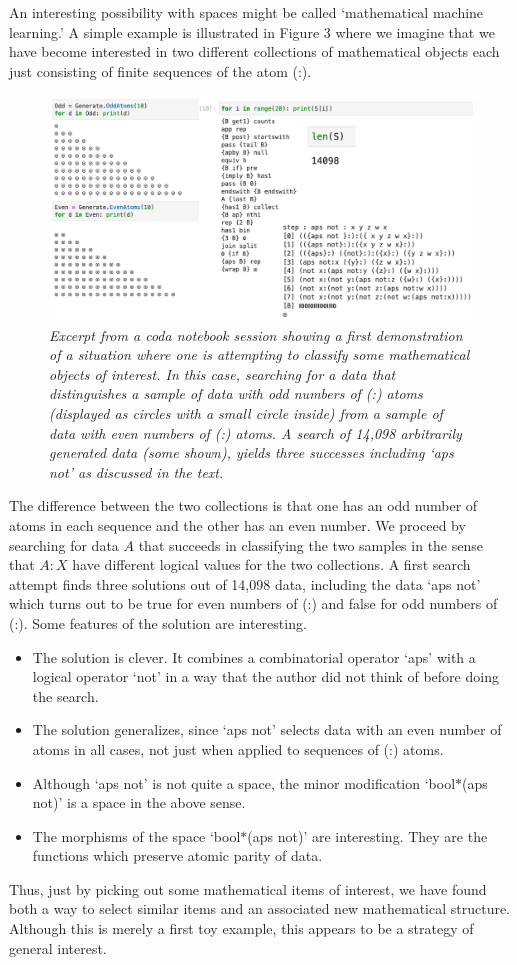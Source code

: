 \documentclass[11pt]{article}
\begin{document}
     An interesting possibility with spaces might be called `mathematical machine learning.'  A simple
example is illustrated in Figure 3 where we imagine that we have become interested in two different
collections of mathematical objects each just consisting of finite sequences of the atom (:).
\begin{figure}[h]
\centering
\includegraphics[width=1.0\textwidth]{machine_learning.png}
\caption{{\it Excerpt from a coda notebook session showing a first demonstration of a situation where one is 
attempting to classify some mathematical objects of interest.  In this case, searching for a data that distinguishes a sample of
data with odd numbers of (:) atoms (displayed as circles with a small circle inside) from a sample of data with even numbers of (:) atoms.  
A search of 14,098 arbitrarily generated data (some shown), yields three successes including `aps not' as discussed in the text.}}
\end{figure}
The difference between the two collections is that one has an odd number of atoms in each sequence and
the other has an even number.  We proceed by searching for data $A$ that succeeds in classifying
the two samples in the sense that $A:X$ have different logical values for the two collections.   A first search attempt
finds three solutions out of 14,098 data, including the data  `aps not' which turns out to be true for
even numbers of (:) and false for odd numbers of (:).
Some features of the solution are interesting.
\begin{itemize}
\item The solution is clever.  It combines a combinatorial operator `aps' with a logical operator `not'
in a way that the author did not think of before doing the search.
\item The solution generalizes, since `aps not' selects data with an even number of atoms in all cases,
not just when applied to sequences of (:) atoms.
\item Although `aps not' is not quite a space, the minor modification `bool$*$(aps not)' is a space
in the above sense.
\item The morphisms of the space `bool$*$(aps not)' are interesting.  They are the functions
which preserve atomic parity of data.
\end{itemize}
Thus, just by picking out some mathematical items of interest, we have found both a way to
select similar items and an associated new mathematical structure.
Although this is merely a first toy example, this appears to be a strategy of general interest.
\end{document}
